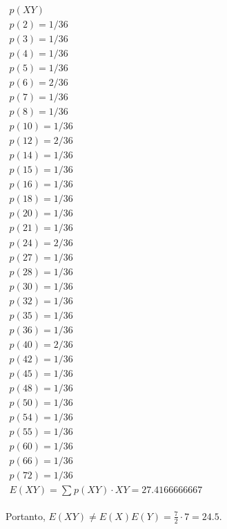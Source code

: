 $\begin{array}{l}
p(XY)\\
p(2) = 1/36 \\
p(3) = 1/36 \\
p(4) = 1/36 \\
p(5) = 1/36 \\
p(6) = 2/36 \\
p(7) = 1/36 \\
p(8) = 1/36 \\
p(10) = 1/36 \\
p(12) = 2/36 \\
p(14) = 1/36 \\
p(15) = 1/36 \\
p(16) = 1/36 \\
p(18) = 1/36 \\
p(20) = 1/36 \\
p(21) = 1/36 \\
p(24) = 2/36 \\
p(27) = 1/36 \\
p(28) = 1/36 \\
p(30) = 1/36 \\
p(32) = 1/36 \\
p(35) = 1/36 \\
p(36) = 1/36 \\
p(40) = 2/36 \\
p(42) = 1/36 \\
p(45) = 1/36 \\
p(48) = 1/36 \\
p(50) = 1/36 \\
p(54) = 1/36 \\
p(55) = 1/36 \\
p(60) = 1/36 \\
p(66) = 1/36 \\
p(72) = 1/36 \\
E(XY) = \sum\nolimits_{}{p(XY) \cdot XY} = 27.4166666667
\end{array}$

Portanto, $E(XY) \neq E(X)E(Y) = \frac{7}{2} \cdot 7 = 24.5$.

